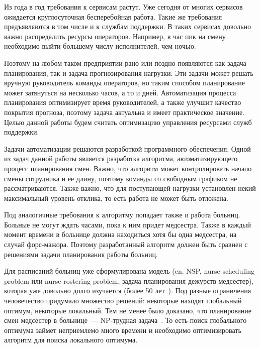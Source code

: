 \documentclass[times,specification,annotation]{itmo-student-thesis}
\begin{document}



\newcommand{\TheOnlyTruePageStyle}{fancy}
\pagestyle{\TheOnlyTruePageStyle}
\renewcommand{\headrulewidth}{0pt}
\renewcommand{\footrulewidth}{0pt}
\lhead{}
\chead{\thepage}
\rhead{}
\lfoot{}
\cfoot{}
\rfoot{}
\addtolength{\voffset}{3mm}
\addtolength{\headsep}{-3mm}
\setcounter{page}{4}
\pretocmd{\tableofcontents}{\begingroup\banhyphens}{}{}
\apptocmd{\tableofcontents}{\endgroup}{}{}

\tableofcontents

\startprefacepage

Из года в год требования к сервисам растут.
Уже сегодня от многих сервисов ожидается круглосуточная бесперебойная работа.
Такие же требования предъявляются в том числе и к службам поддержки.
В таких сервисах довольно важно распределить ресурсы операторов.
Например, в час пик на смену необходимо выйти большему числу исполнителей, чем ночью.

Поэтому на любом таком предприятии рано или поздно появляются как задача планирования, так и задача прогнозирования нагрузки.
Эти задачи может решать вручную руководитель команды операторов, но таким способом планирование может затянуться на несколько часов, а то и дней.
Автоматизация процесса планирования оптимизирует время руководителей, а также улучшит качество покрытия прогноза, поэтому задача актуальна и имеет практическое значение.
Целью данной работы будем считать оптимизацию управления ресурсами служб поддержки.

Задачи автоматизации решаются разработкой программного обеспечения.
Одной из задач данной работы является разработка алгоритма, автоматизирующего процесс планирования смен.
Важно, что алгоритм может контролировать начало смены сотрудника и ее длину, поэтому команды со свободным графиком не рассматриваются.
Также важно, что для поступающей нагрузки установлен некий максимальный уровень отклика, то есть работа не может быть отложена.

Под аналогичные требования к алгоритму попадает также и работа больниц.
Больные не могут ждать часами, пока к ним придет медсестра.
Также в каждый момент времени в больнице должна находиться хотя бы одна медсестра, на случай форс-мажора.
Поэтому разработанный алгоритм должен быть сравнен с решениями задачи планирования работы больниц.

Для расписаний больниц уже сформулирована модель (en. NSP, nurse scheduling problem или nurse rostering problem, задача планирования дежурств медсестер), которая уже довольно долго изучается (более 50 лет~\cite{indirect-ga-nsp}).
Под разные ограничения человечество придумало множество решений: некоторые находят глобальный оптимум, некоторые локальный.
Тем не менее было доказано, что планирование смен медсестер в больнице~--- NP-трудная задача~\cite{10.1007/3-540-61794-9_66}.
То есть поиск глобального оптимума займет неприемлемо много времени и необходимо оптимизировать алгоритм для поиска локального оптимума.
\end{document}

